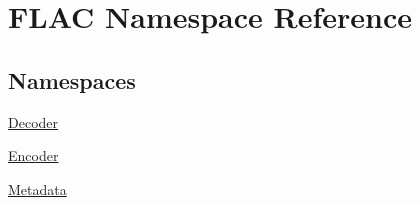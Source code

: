 \hypertarget{namespace_f_l_a_c}{}\section{F\+L\+AC Namespace Reference}
\label{namespace_f_l_a_c}
\subsection*{Namespaces}
\begin{DoxyCompactItemize}
\item 
 \hyperlink{namespace_f_l_a_c_1_1_decoder}{Decoder}
\item 
 \hyperlink{namespace_f_l_a_c_1_1_encoder}{Encoder}
\item 
 \hyperlink{namespace_f_l_a_c_1_1_metadata}{Metadata}
\end{DoxyCompactItemize}
